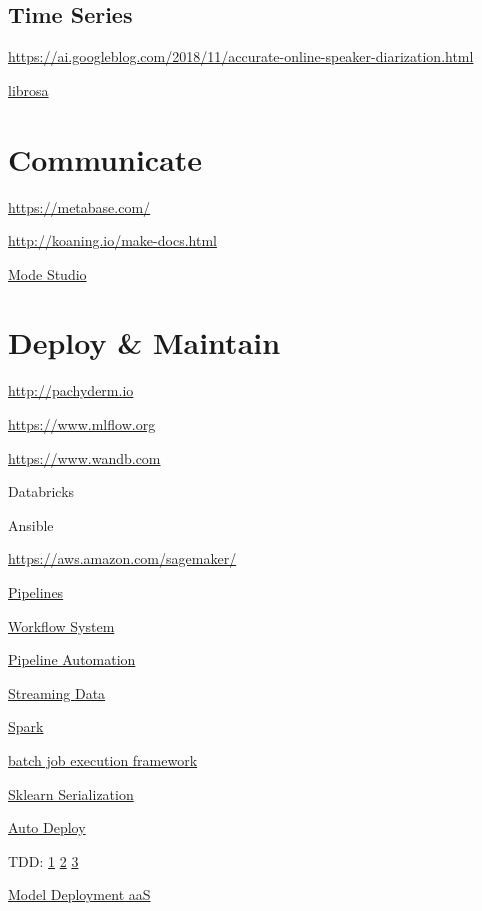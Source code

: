 \documentclass[]{book}
\begin{document}
\subsection{Time Series}\label{time-series-1}

\url{https://ai.googleblog.com/2018/11/accurate-online-speaker-diarization.html}

\href{https://librosa.github.io/librosa/tutorial.html\#overview}{librosa}

\section{Communicate}\label{communicate-2}

\url{https://metabase.com/}

\url{http://koaning.io/make-docs.html}

\href{https://about.modeanalytics.com/}{Mode Studio}

\section{Deploy \& Maintain}\label{deploy-maintain}

\url{http://pachyderm.io}

\url{https://www.mlflow.org}

\url{https://www.wandb.com}

Databricks

Ansible

\url{https://aws.amazon.com/sagemaker/}

\href{http://stat545.com/automation01_slides/\#/automating-data-analysis-pipelines}{Pipelines}

\href{https://snakemake.readthedocs.io/en/stable/}{Workflow System}

\href{http://stat545.com/automation01_slides/\#/automating-data-analysis-pipelines}{Pipeline
Automation}

\href{https://www.wallaroolabs.com}{Streaming Data}

\href{https://docs.azuredatabricks.net/spark/latest/mllib/mllib-pipelines-and-stuctured-streaming.html}{Spark}

\href{https://stitchfix.github.io/flotilla-os/}{batch job execution
framework}

\href{https://cmry.github.io/notes/serialize}{Sklearn Serialization}

\href{http://content.nexosis.com/twimlai}{Auto Deploy}

TDD:
\href{http://engineering.pivotal.io/post/test-driven-development-for-data-science/}{1}
\textbar{} \href{http://www.tdda.info/}{2} \textbar{}
\href{http://stochasticsolutions.com/}{3}

\href{https://orchestrahq.com}{Model Deployment aaS}


\end{document}
